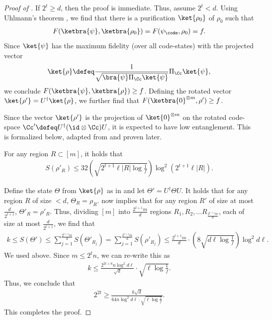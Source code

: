 \documentclass{toc}
\begin{document}
\begin{proof}[Proof of ]
%
If  %
$2^t\geq d$, then the proof is immediate. Thus, assume $2^t< d$. Using Uhlmann's theorem \cite{uhlmann76}, we find that there is a purification $\ket{\rho_0}$ of $\rho_0$ such that 
\begin{align}F(\ketbra{\psi},\ketbra{\rho_0})=F(\psi_{\code},\rho_0)= f.
\end{align}
Since $\ket{\psi}$ has the maximum fidelity (over all code-states) with the projected vector 
\begin{align}\ket{\rho} \defeq \frac{1}{\sqrt{\bra{\psi}\Pi_\Cc\ket{\psi}}}\Pi_\Cc\ket{\psi},\end{align} we conclude $F(\ketbra{\psi},\ketbra{\rho})\geq f$. Defining the rotated vector $\ket{\rho'}=U^{\dagger}\ket{\rho}$, we further find that $F(\ketbra{0}^{\otimes m}, \rho')\geq f$.

Since the vector $\ket{\rho'}$ is the projection of $\ket{0}^{\otimes m}$ on the rotated code-space $\Cc'\defeq U^{\dagger}(\id\otimes \Cc) U$, it is expected to have low entanglement. This is formalized below, adapted from \cite{hastings2007area_law, AradLV12, AradKLV13} and proven later.
\begin{claim}
\label{clm:quadlowent}
For any region $R\subset [m]$, it holds that
\begin{align}S(\rho'_R) \leq 32\left(\sqrt{2^{t+1}\ell|R|\log\frac{1}{f}}\right)\log^2 (2^{t+1}\ell|R|).\end{align} 
\end{claim}

Define the state $\Theta$ from $\ket{\rho}$ as in  and let $\Theta'= U^{\dagger}\Theta U$. It holds that for any region $R$ of size $<d$, $\Theta_R=\rho_R$.  now implies that for any region $R'$ of size at most $\frac{d}{2^{t+1}}$, $\Theta'_R=\rho'_R$. Thus, dividing $[m]$ into $\frac{2^{t+1}m}{d}$ regions $R_1,R_2, \ldots R_{\frac{2^{t+1}m}{d}}$, each of size at most $\frac{d}{2^{t+1}}$, we find that 
\begin{align}k\leq S(\Theta') \leq \sum_{j=1}^{\frac{2^{t+1}m}{d}}S(\Theta'_{R_j})=\sum_{j=1}^{\frac{2^{t+1}m}{d}}S(\rho'_{R_j})\leq \frac{2^{t+1}m}{d}\cdot \left(8\sqrt{d\ell\log\frac{1}{f}}\right)\log^2 d\ell.\end{align}
We used  above. Since $m\leq 2^tn$, we can re-write this as
\begin{align}
k \leq \frac{2^{2t+6}n\log^2 d\ell}{\sqrt{d}}\cdot \sqrt{\ell\log\frac{1}{f}}.\end{align}
Thus, we conclude that 
\begin{align}2^{2t}\geq \frac{k\sqrt{d}}{64 n \log^2 d\ell \cdot \sqrt{\ell\log\frac{1}{f}}}.\end{align}
This completes the proof.
\end{proof}
\end{document}

